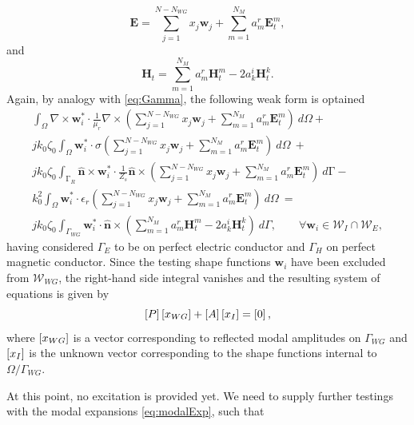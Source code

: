 \begin{equation}
\mathbf{E} = \sum_{j=1}^{N-N_{WG}} x_j \mathbf{w}_j + \sum_{m=1}^{N_M} a_m^r \mathbf{E}_t^m,
\end{equation}
\noindent and
\begin{equation}
\mathbf{H}_t = \sum_{m=1}^{N_M} a_m^r \mathbf{H}_t^m - 2 a_k^i \mathbf{H}_t^k.
\end{equation}
\noindent Again, by analogy with \eqref{eq:Gamma}, the following weak form is optained \cite{zhu2006multigrid} 
%
\begin{multline}
\label{eq:FEMformTFE1}
\int_\Omega \nabla \times \mathbf{w}_i^* \cdot \frac{1}{\mu_r} \nabla \times \left( \sum_{j=1}^{N-N_{WG}} x_j \mathbf{w}_j + \sum_{m=1}^{N_M} a_m^r \mathbf{E}_t^m \right) \ d\Omega +\\
 j k_0 \zeta_0 \int_\Omega \mathbf{w}_i^* \cdot \sigma \left( \sum_{j=1}^{N-N_{WG}} x_j \mathbf{w}_j + \sum_{m=1}^{N_M} a_m^r \mathbf{E}_t^m \right) \ d\Omega \ + \\
 j k_0 \zeta_0 \int_{\mathrm{\Gamma}_R} \hat{\mathbf{n}} \times \mathbf{w}_i^* \cdot \frac{1}{Z_s} \hat{\mathbf{n}} \times \left( \sum_{j=1}^{N-N_{WG}} x_j \mathbf{w}_j + \sum_{m=1}^{N_M} a_m^r \mathbf{E}_t^m \right) \ d\mathrm{\Gamma} - \\
 k_0^2 \int_\Omega \mathbf{w}_i^* \cdot \epsilon_r \left( \sum_{j=1}^{N-N_{WG}} x_j \mathbf{w}_j + \sum_{m=1}^{N_M} a_m^r \mathbf{E}_t^m \right) \ d\Omega \ = \\ 
 j k_0 \zeta_0 \int_{\Gamma_{WG}}  \mathbf{w}_i^* \cdot \hat{\mathbf{n}} \times \left( \sum_{m=1}^{N_M} a_m^r \mathbf{H}_t^m - 2 a_k^i \mathbf{H}_t^k \right) \ d\Gamma, \qquad \forall \mathbf{w}_i \in \mathcal{W}_I\cap \mathcal{W}_E,
\end{multline}
\noindent having considered $\Gamma_E$ to be on perfect electric conductor and $\Gamma_H$ on perfect magnetic conductor. Since the testing shape functions $\mathbf{w}_i$ have been excluded from $\mathcal{W}_{WG}$, the right-hand side integral vanishes and the resulting system of equations is given by
\begin{equation}
\label{eq:FEInt1}
\left[P\right] \left[{{x_{WG}}}\right] + \left[A\right] \left[{{x_I}}\right] = \left[{{0}}\right],
\end{equation}
\noindent where $\left[{{x_{WG}}}\right]$ is a vector corresponding to reflected modal amplitudes on $\Gamma_{WG}$ and $\left[{{x_I}}\right]$ is the unknown vector corresponding to the shape functions internal to $\Omega / \Gamma_{WG}$.

At this point, no excitation is provided yet. We need to supply further testings with the modal expansions \eqref{eq:modalExp}, such that

